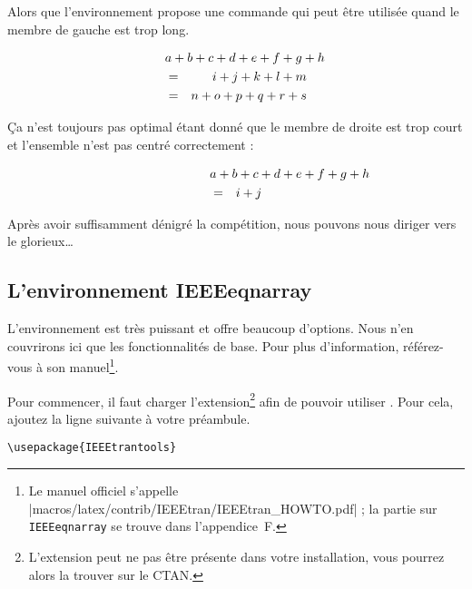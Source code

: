 \noindent Alors que l'environnement propose une commande 
qui peut être utilisée quand le membre de gauche est trop long.
\begin{example}
\begin{eqnarray}
  \lefteqn{a + b + c + d
    + e + f + g + h}\nonumber\\
  & = & i + j + k + l + m
  \\
  & = & n + o + p + q + r + s
\end{eqnarray}
\end{example}
\noindent Ça n'est toujours pas optimal étant donné que le membre de droite
est trop court et l'ensemble n'est pas centré correctement :
\begin{example}
\begin{eqnarray}
  \lefteqn{a + b + c + d
    + e + f + g + h}
  \nonumber \\
  & = & i + j
\end{eqnarray}
\end{example}

\noindent Après avoir suffisamment dénigré la compétition, nous
pouvons nous diriger vers le glorieux\ldots

\subsection{L'environnement IEEEeqnarray}
\label{sec:IEEEeqnarray_intro}

L'environnement  est très puissant et offre beaucoup
d'options. Nous n'en couvrirons ici que les fonctionnalités de base. Pour plus
d'information, référez-vous à son manuel\footnote{Le manuel officiel
  s'appelle \CTAN|macros/latex/contrib/IEEEtran/IEEEtran_HOWTO.pdf| ; la partie sur \texttt{IEEEeqnarray}
  se trouve dans l'appendice~F.}.

Pour commencer, il faut charger l'extension\footnote{L'extension
   peut ne pas être présente dans votre
  installation, vous pourrez alors la trouver sur le CTAN.}
 afin de pouvoir utiliser . Pour
cela, ajoutez la ligne suivante à votre préambule.  \small
\begin{verbatim}
\usepackage{IEEEtrantools}
\end{verbatim}
\normalsize

